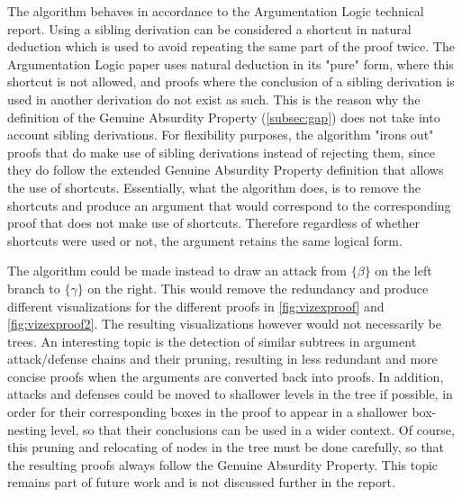 \documentclass[11pt,twoside,a4paper]{report}
\begin{document}
The algorithm behaves in accordance to the Argumentation Logic technical report. Using a sibling derivation can be considered a shortcut in natural deduction which is used to avoid repeating the same part of the proof twice. The Argumentation Logic paper uses natural deduction in its "pure" form, where this shortcut is not allowed, and proofs where the conclusion of a sibling derivation is used in another derivation do not exist as such. This is the reason why the definition of the Genuine Absurdity Property (\autoref{subsec:gap}) does not take into account sibling derivations. For flexibility purposes, the algorithm "irons out" proofs that do make use of sibling derivations instead of rejecting them, since they do follow the extended Genuine Absurdity Property definition that allows the use of shortcuts. Essentially, what the algorithm does, is to remove the shortcuts and produce an argument that would correspond to the corresponding proof that does not make use of shortcuts. Therefore regardless of whether shortcuts were used or not, the argument retains the same logical form.

The algorithm could be made instead to draw an attack from $\{\beta\}$ on the left branch to $\{\gamma\}$ on the right. This would remove the redundancy and produce different visualizations for the different proofs in \autoref{fig:vizexproof} and \autoref{fig:vizexproof2}. The resulting visualizations however would not necessarily be trees. An interesting topic is the detection of similar subtrees in argument attack/defense chains and their pruning, resulting in less redundant and more concise proofs when the arguments are converted back into proofs. In addition, attacks and defenses could be moved to shallower levels in the tree if possible, in order for their corresponding boxes in the proof to appear in a shallower box-nesting level, so that their conclusions can be used in a wider context. Of course, this pruning and relocating of nodes in the tree must be done carefully, so that the resulting proofs always follow the Genuine Absurdity Property. This topic remains part of future work and is not discussed further in the report.
\end{document}
